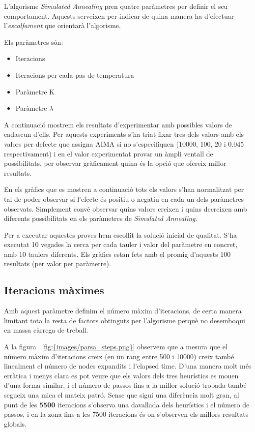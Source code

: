 
L'algorisme \emph{Simulated Annealing} pren quatre paràmetres per definir el seu comportament. Aquests serveixen per indicar de quina manera ha d'efectuar l'\emph{escalfament} que orientarà l'algorisme.

Els paràmetres són:

\begin{itemize}
	\item Iteracions
	\item Iteracions per cada pas de temperatura
	\item Paràmetre K
	\item Paràmetre $\lambda$
\end{itemize}

A continuació mostrem els resultats d'experimentar amb possibles valors de cadascun d'ells. Per aquests experiments s'ha triat fixar tres dels valors amb els valors per defecte que assigna AIMA si no s'especifiquen (10000, 100, 20 i 0.045 respectivament) i en el valor experimentat provar un àmpli ventall de possibilitats, per observar gràficament quina és la opció que ofereix millor resultats.

En els gràfics que es mostren a continuació tots els valors s'han normalitzat per tal de poder observar si l'efecte és positiu o negatiu en cada un dels paràmetres observats. Simplement convé observar quins valors creixen i quins decreixen amb diferents possibilitats en els paràmetres de \emph{Simulated Annealing}.

Per a executar aquestes proves hem escollit la solució inicial de qualitat. S'ha executat 10 vegades la cerca per cada tauler i valor del paràmetre en concret, amb 10 taulers diferents. Els gràfics estan fets amb el promig d'aquests 100 resultats (per valor per paràmetre).

\newpage
\subsection{Iteracions màximes} %
\label{sub:iteracions}

Amb aquest paràmetre definim el número màxim d'iteracions, de certa manera limitant tota la resta de factors obtinguts per l'algorisme perquè no desemboqui en massa càrrega de treball.


A la figura ~\ref{fig:{images/parsa_steps.png}} observem que a mesura que el número màxim d'iteracions creix (en un rang entre 500 i 10000) creix també linealment el número de nodes expandits i l'elapsed time. D'una manera molt més erràtica i menys clara es pot veure que els valors dels tres heurístics es mouen d'una forma similar, i el número de passos fins a la millor solució trobada també segueix una mica el mateix patró. Sense que sigui una diferència molt gran, al punt de les \textbf{5500} iteracions s'observa una davallada dels heurístics i el número de passos, i en la zona fins a les 7500 iteracions és on s'observen els millors resultats globals.


